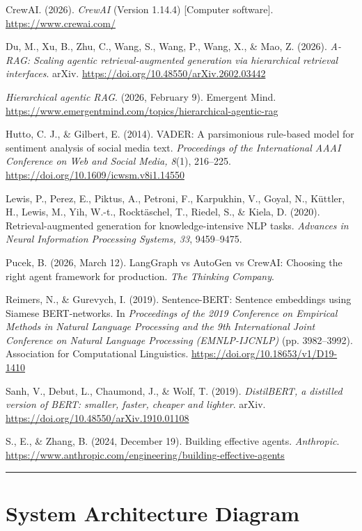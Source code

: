 \documentclass[11pt,a4paper]{article}
\begin{document}
CrewAI. (2026). \emph{CrewAI} (Version 1.14.4) {[}Computer software{]}. \url{https://www.crewai.com/}

Du, M., Xu, B., Zhu, C., Wang, S., Wang, P., Wang, X., \& Mao, Z. (2026). \emph{A-RAG: Scaling agentic retrieval-augmented generation via hierarchical retrieval interfaces}. arXiv. \url{https://doi.org/10.48550/arXiv.2602.03442}

\emph{Hierarchical agentic RAG}. (2026, February 9). Emergent Mind. \url{https://www.emergentmind.com/topics/hierarchical-agentic-rag}

Hutto, C. J., \& Gilbert, E. (2014). VADER: A parsimonious rule-based model for sentiment analysis of social media text. \emph{Proceedings of the International AAAI Conference on Web and Social Media, 8}(1), 216--225. \url{https://doi.org/10.1609/icwsm.v8i1.14550}

Lewis, P., Perez, E., Piktus, A., Petroni, F., Karpukhin, V., Goyal, N., Küttler, H., Lewis, M., Yih, W.-t., Rocktäschel, T., Riedel, S., \& Kiela, D. (2020). Retrieval-augmented generation for knowledge-intensive NLP tasks. \emph{Advances in Neural Information Processing Systems, 33}, 9459--9475.

Pucek, B. (2026, March 12). LangGraph vs AutoGen vs CrewAI: Choosing the right agent framework for production. \emph{The Thinking Company}.

Reimers, N., \& Gurevych, I. (2019). Sentence-BERT: Sentence embeddings using Siamese BERT-networks. In \emph{Proceedings of the 2019 Conference on Empirical Methods in Natural Language Processing and the 9th International Joint Conference on Natural Language Processing (EMNLP-IJCNLP)} (pp. 3982--3992). Association for Computational Linguistics. \url{https://doi.org/10.18653/v1/D19-1410}

Sanh, V., Debut, L., Chaumond, J., \& Wolf, T. (2019). \emph{DistilBERT, a distilled version of BERT: smaller, faster, cheaper and lighter}. arXiv. \url{https://doi.org/10.48550/arXiv.1910.01108}

S., E., \& Zhang, B. (2024, December 19). Building effective agents. \emph{Anthropic}. \url{https://www.anthropic.com/engineering/building-effective-agents}

\begin{center}\rule{0.5\linewidth}{0.5pt}\end{center}

\appendix

\clearpage
\section{System Architecture Diagram}\label{appendix-a-system-architecture-diagram}
\end{document}
